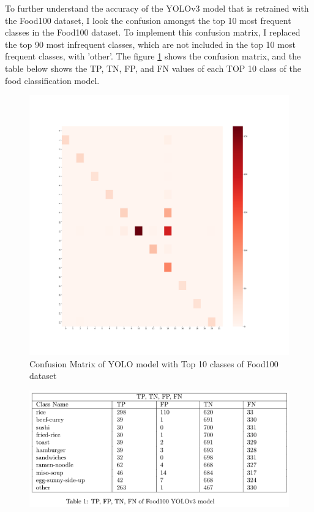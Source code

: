 \documentclass{article}
\begin{document}
To further understand the accuracy of the YOLOv3 model that is retrained with the Food100 dataset, I look the confusion amongst the top 10 most frequent classes in the Food100 dataset. To implement this confusion matrix, I replaced the top 90 most infrequent classes, which are not included in the top 10 most frequent classes, with 'other'. The figure \ref{fig:cm_food100_top10_classes} shows the confusion matrix, and the table below shows the TP, TN, FP, and FN values of each TOP 10 class of the food classification model.

\begin{figure}[H]
    \centering
    \includegraphics[scale=0.2]{imgs/confusionMatrix_food_modified.png}
    \caption{Confusion Matrix of YOLO model with Top 10 classes of Food100 dataset}
    \label{fig:cm_food100_top10_classes}
\end{figure}

\begin{figure}[H]
    \centering
    \includegraphics[scale=0.5]{imgs/Food100_table.png}
    \label{fig:food100_table}
\end{figure}
\end{document}
